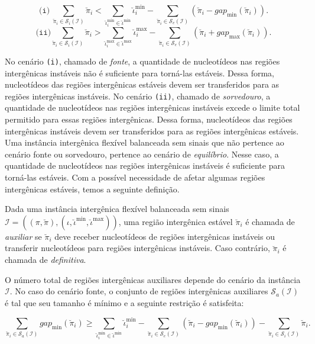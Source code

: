 $$\texttt{(i)}~\sum_{\breve\pi_i \in \mathcal{S}_{i}(\mathcal{I})} \breve\pi_i < \sum_{\breve\iota_{i}^{\min}  \in \breve\iota^{\min}} \breve\iota_{i}^{\min} - \sum_{\breve\pi_i \in \mathcal{S}_{e}(\mathcal{I})} (\breve\pi_i - gap_{\min}(\breve\pi_i)).$$
$$\texttt{(ii)}\sum_{\breve\pi_i \in \mathcal{S}_{i}(\mathcal{I})} \breve\pi_i > \sum_{\breve\iota_{i}^{\max}  \in \breve\iota^{\max}} \breve\iota_{i}^{\max} - \sum_{\breve\pi_i \in \mathcal{S}_{e}(\mathcal{I})} (\breve\pi_i + gap_{\max}(\breve\pi_i)).$$

No cenário \texttt{(i)}, chamado de \emph{fonte}, a quantidade de nucleotídeos nas regiões intergênicas instáveis não é suficiente para torná-las estáveis. Dessa forma, nucleotídeos das regiões intergênicas estáveis devem ser transferidos para as regiões intergênicas instáveis. No cenário \texttt{(ii)}, chamado de \emph{sorvedouro}, a quantidade de nucleotídeos nas regiões intergênicas instáveis excede o limite total permitido para essas regiões intergênicas. Dessa forma, nucleotídeos das regiões intergênicas instáveis devem ser transferidos para as regiões intergênicas estáveis. Uma instância intergênica flexível balanceada sem sinais que não pertence ao cenário fonte ou sorvedouro, pertence ao cenário de \emph{equilíbrio}. Nesse caso, a quantidade de nucleotídeos nas regiões intergênicas instáveis é suficiente para torná-las estáveis. Com a possível necessidade de afetar algumas regiões intergênicas estáveis, temos a seguinte definição. 

\begin{definition}
  Dada uma instância intergênica flexível balanceada sem sinais $\mathcal{I} = ((\pi,\breve\pi),(\iota,\breve\iota^{\min},\breve\iota^{\max}))$, uma região intergênica estável $\breve\pi_i$ é chamada de \emph{auxiliar} se $\breve\pi_i$ deve receber nucleotídeos de regiões intergênicas instáveis ou transferir nucleotídeos para regiões intergênicas instáveis. Caso contrário, $\breve\pi_i$ é chamada de \emph{definitiva}.
\end{definition}

O número total de regiões intergênicas auxiliares depende do cenário da instância $\mathcal{I}$. No caso do cenário fonte, o conjunto de regiões intergênicas auxiliares $\mathcal{S}_{a}(\mathcal{I})$ é tal que seu tamanho é mínimo e a seguinte restrição é satisfeita:

$$\sum_{\breve\pi_i \in \mathcal{S}_{a}(\mathcal{I})} gap_{\min}(\breve\pi_i) \ge \sum_{\breve\iota_{i}^{\min}  \in \breve\iota^{\min}} \breve\iota_{i}^{\min} - \sum_{\breve\pi_i \in \mathcal{S}_{e}(\mathcal{I})} (\breve\pi_i - gap_{\min}(\breve\pi_i)) - \sum_{\breve\pi_i \in \mathcal{S}_{i}(\mathcal{I})} \breve\pi_i.$$

